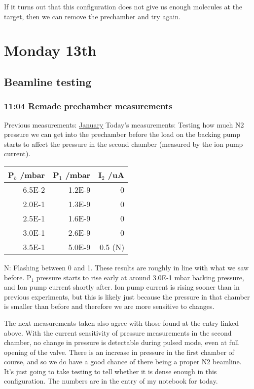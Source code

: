 \documentclass[11pt]{article}
\begin{document}
If it turns out that this configuration does not give us enough
molecules at the target, then we can remove the prechamber and try
again. 
\section*{Monday 13th}
\label{sec-4}
\subsection*{Beamline testing}
\label{sec-4-1}
\subsubsection*{11:04 Remade prechamber measurements}
\label{sec-4-1-1}

Previous measurements: \hyperref[id-2e3d7b82-77d8-4e7f-82b9-6300c3e6dcfb]{January}
Today's measurements:
Testing how much N2 pressure we can get into the prechamber before the
load on the backing pump starts to affect the pressure in the second
chamber (measured by the ion pump current).


\begin{center}
\begin{tabular}{rrr}
 P$_b$ /mbar  &  P$_1$ /mbar  &  I$_2$ /uA  \\
\hline
      6.5E-2  &       1.2E-9  &          0  \\
      2.0E-1  &       1.3E-9  &          0  \\
      2.5E-1  &       1.6E-9  &          0  \\
      3.0E-1  &       2.6E-9  &          0  \\
      3.5E-1  &       5.0E-9  &    0.5 (N)  \\
\end{tabular}
\end{center}



N: Flashing between 0 and 1.
These results are roughly in line with what we saw before. P$_1$
pressure starts to rise early at around 3.0E-1 mbar backing pressure,
and Ion pump current shortly after. Ion pump current is rising sooner
than in previous experiments, but this is likely just because the
pressure in that chamber is smaller than before and therefore we are
more sensitive to changes.

The next measurements taken also agree with those found at the entry
linked above. With the current sensitivity of pressure measurements in
the second chamber, no change in pressure is detectable during pulsed
mode, even at full opening of the valve. There is an increase in
pressure in the first chamber of course, and so we do have a good
chance of there being a proper N2 beamline. It's just going to take
testing to tell whether it is dense enough in this configuration. The
numbers are in the entry of my notebook for today. 
\end{document}
